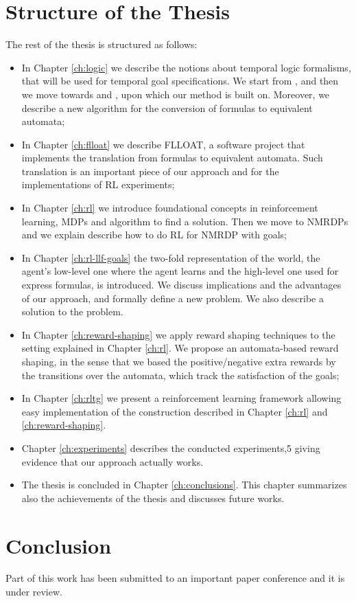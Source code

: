 \section{Structure of the Thesis}\label{sect:intro-structure-thesis}
The rest of the thesis is structured as follows:
\begin{itemize}
	\item In Chapter \ref{ch:logic} we describe the notions about temporal logic formalisms, that will be used for temporal goal specifications. We start from \LTL, \REGEX and then we move towards \LTLf and \LDLf, upon which our method is built on. Moreover, we describe a new algorithm for the conversion of \LLf formulas to equivalent automata;
	\item In Chapter \ref{ch:flloat} we describe FLLOAT, a software project that implements the translation from \LLf formulas to equivalent automata. Such translation is an important piece of our approach and for the implementations of RL experiments;
	\item In Chapter \ref{ch:rl} we introduce foundational concepts in reinforcement learning, MDPs and algorithm to find a solution. Then we move to NMRDPs and we explain describe how to do RL for NMRDP with \LLf goals;
	\item In Chapter \ref{ch:rl-llf-goals} the two-fold representation of the world, the agent's low-level one where the agent learns and the high-level one used for express \LLf formulas, is introduced. We discuss implications and the advantages of our approach, and formally define a new problem. We also describe a solution to the problem.
	\item In Chapter \ref{ch:reward-shaping} we apply reward shaping techniques to the setting explained in Chapter \ref{ch:rl}. We propose an automata-based reward shaping, in the sense that we based the positive/negative extra rewards by the transitions over the automata, which track the satisfaction of the \LLf goals;
	\item In Chapter \ref{ch:rltg} we present a reinforcement learning framework allowing easy implementation of the construction described in Chapter \ref{ch:rl} and \ref{ch:reward-shaping}.
	\item Chapter \ref{ch:experiments} describes the conducted experiments,5 giving evidence that our approach actually works.
	\item The thesis is concluded in Chapter \ref{ch:conclusions}. This chapter summarizes also the achievements of
	the thesis and discusses future works.
\end{itemize}

\section{Conclusion}
Part of this work has been submitted to an important paper conference and it is under review.